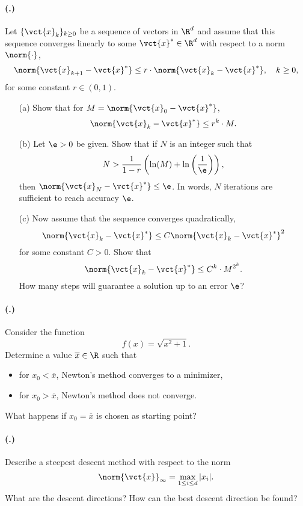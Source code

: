 \documentclass{article}
\newcounter{problemSheetNumber}
\newcounter{problems}
\renewcommand{\problem}{\paragraph{(\theproblemSheetNumber.\theproblems)}\addtocounter{problems}{1}}
\begin{document}
\problem Let $\{\vct{x}_k\}_{k\geq 0}$ be a sequence of vectors in $\R^d$ and assume that this sequence converges linearly to some $\vct{x}^*\in \R^d$ with respect to a norm $\norm{\cdot}$,
\begin{equation*}
 \norm{\vct{x}_{k+1}-\vct{x}^*} \leq r\cdot \norm{\vct{x}_k-\vct{x}^*}, \quad k\geq 0,
\end{equation*}
for some constant $r\in (0,1)$. 
\begin{itemize}
 \item[(a)] Show that for $M=\norm{\vct{x}_0-\vct{x}^*}$, 
 \begin{equation*}
  \norm{\vct{x}_k-\vct{x}^*} \leq r^k \cdot M.
 \end{equation*}
\item[(b)] Let $\e>0$ be given. Show that if $N$ is an integer such that
\begin{equation*}
 N> \frac{1}{1-r}\left(\ln(M)+\ln\left(\frac{1}{\e}\right)\right),
\end{equation*}
then $\norm{\vct{x}_N-\vct{x}^*}\leq \e$. In words, $N$ iterations are sufficient to reach accuracy $\e$.
\item[(c)] Now assume that the sequence converges quadratically,
\begin{equation*}
 \norm{\vct{x}_k-\vct{x}^*}\leq C\norm{\vct{x}_k-\vct{x}^*}^2
\end{equation*}
for some constant $C>0$. Show that
\begin{equation*}
 \norm{\vct{x}_k-\vct{x}^*}\leq C^k \cdot M^{2^k}.
\end{equation*}
How many steps will guarantee a solution up to an error $\e$?
\end{itemize}

 \problem Consider the function
 \begin{equation*}
  f(x) = \sqrt{x^2+1}.
 \end{equation*}
Determine a value $\overline{x}\in \R$ such that
\begin{itemize}
 \item for $x_0<\overline{x}$, Newton's method converges to a minimizer,
 \item for $x_0>\overline{x}$, Newton's method does not converge.
\end{itemize}
What happens if $x_0=\overline{x}$ is chosen as starting point?
 
 \problem Describe a steepest descent method with respect to the norm 
 \begin{equation*}
  \norm{\vct{x}}_{\infty} = \max_{1\leq i\leq d} |x_i|.
 \end{equation*}
What are the descent directions? How can the best descent direction be found?
 
\end{document}

